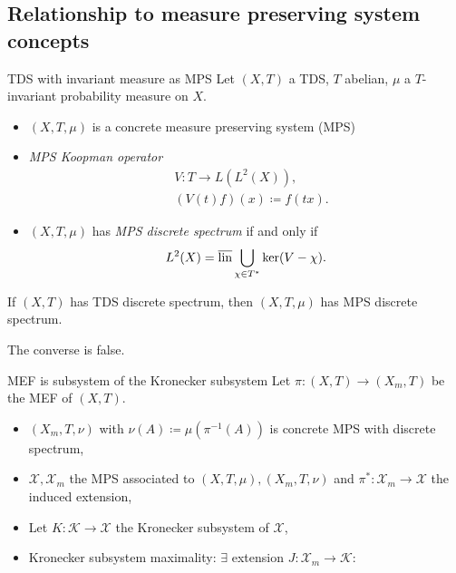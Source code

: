 \subsection{Relationship to measure preserving system concepts}
\begin{frame}{TDS with invariant measure as MPS}
Let $(X,T)$ a TDS, $T$ abelian, $\mu$ a $T$-invariant probability measure on $X$.
\begin{itemize}
  \item $(X,T,\mu)$ is a concrete measure preserving system (MPS)
  \item \emph{MPS Koopman operator}
\begin{equation*}
  \begin{split}
    &V : T \to L(L^2(X)),\\
    & (V(t) f)(x) \coloneq f (t x). 
  \end{split}
\end{equation*}
\item
  $(X,T,\mu)$ has \emph{MPS discrete spectrum} if and only if
  \begin{equation*}
    L^2(X) = \overline{\operatorname{lin}} \bigcup_{\chi \in T^*} \ker (V - \chi).
  \end{equation*}
\end{itemize}
\pause
\begin{proposition}
  If $(X,T)$ has TDS discrete spectrum, then $(X,T,\mu)$ has MPS discrete spectrum.
  \end{proposition}
  The converse is false.
\end{frame}
\begin{frame}[fragile]{MEF is subsystem of the Kronecker subsystem}
  Let $\pi : (X,T) \to (X_m,T)$ be the MEF of $(X,T)$.
  \begin{itemize}
    \item $(X_m,T, \nu)$ with $\nu(A)\coloneq  \mu(\pi^{-1}(A))$ is concrete MPS with discrete spectrum,
  \item $\mathcal{X}, \mathcal{X}_m$ the MPS associated to $(X,T,\mu), (X_m,T,\nu)$ and $\pi^* : \mathcal{X}_m \to \mathcal{X}$ the induced extension,
  \item Let $K: \mathcal{K} \to \mathcal{X}$ the Kronecker subsystem of $\mathcal{X}$,
  \item Kronecker subsystem maximality: $\exists$ extension $J: \mathcal{X}_m \to \mathcal{K}$:
\end{itemize}
  \begin{center}
  \end{center}
  \end{frame}

